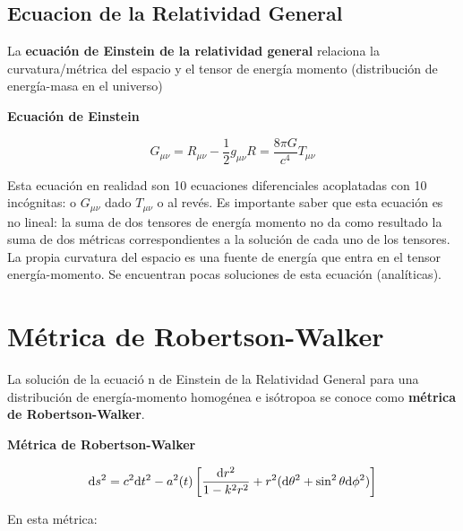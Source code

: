\subsection{Ecuacion de la Relatividad General}

La \textbf{ecuación de Einstein de la relatividad general} relaciona la curvatura/métrica del espacio y el tensor de energía momento (distribución de energía-masa en el universo)

\begin{Resaltar}
	\begin{center}
		\textbf{Ecuación de Einstein}
	\end{center}
	\begin{equation}
		G_{\mu \nu} = R_{\mu \nu} - \frac{1}{2} g_{\mu \nu} R = \frac{8 \pi G}{c^4} T_{\mu \nu}
	\end{equation}
\end{Resaltar}
Esta ecuación en realidad son 10 ecuaciones diferenciales acoplatadas con 10 incógnitas: o $G_{\mu \nu}$ dado $T_{\mu \nu}$ o al revés. Es importante saber que esta ecuación es no lineal: la suma de dos tensores de energía momento no da como resultado la suma de dos métricas correspondientes a la solución de cada uno de los tensores. La propia curvatura del espacio es una fuente de energía que entra en el tensor energía-momento. Se encuentran pocas soluciones de esta ecuación (analíticas).


\section{Métrica de Robertson-Walker}

La solución de la ecuació n de Einstein de la Relatividad General para una distribución de energía-momento homogénea e isótropoa se conoce como \textbf{métrica de Robertson-Walker}.

\begin{Resaltar}
	\begin{center}
		\textbf{Métrica de Robertson-Walker}
	\end{center}
	\begin{equation}
		\mathrm{d} s^2 = c^2 \mathrm{d} t^2 - a^2(t) \left[ \frac{\mathrm{d} r^2}{1-k^2 r^2} + r^2 (\mathrm{d} \theta^2 + \sin^2 \theta \mathrm{d} \phi^2) \right]
	\end{equation}
\end{Resaltar}
En esta métrica:

